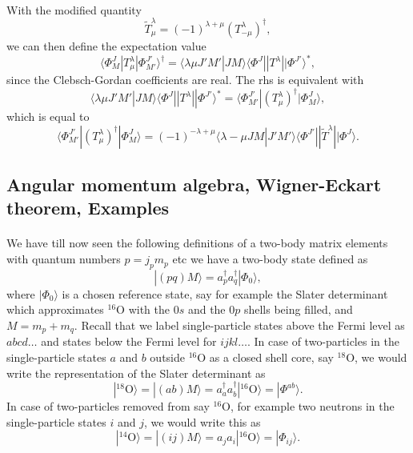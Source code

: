 \documentclass[%
twoside,                 %
final,                   %
10pt]{article}
\begin{document}
\paragraph{}
With the modified quantity 
\[
\tilde{T}^{\lambda}_{\mu}=(-1)^{\lambda+\mu}(T^{\lambda}_{-\mu})^{\dagger},
\]
we can then define the expectation value
\[
\langle \Phi^J_M|T^{\lambda}_{\mu}|\Phi^{J'}_{M'}\rangle^{\dagger} = \langle \lambda \mu J'M'|JM\rangle\langle \Phi^J||T^{\lambda}||\Phi^{J'}\rangle^*,
\]
since the Clebsch-Gordan coefficients are real. The rhs is equivalent with 
\[
\langle \lambda \mu J'M'|JM\rangle\langle \Phi^J||T^{\lambda}||\Phi^{J'}\rangle^*=\langle \Phi^{J'}_{M'}|(T^{\lambda}_{\mu})^{\dagger}|\Phi^{J}_{M}\rangle,
\]
which is equal to 
\[
\langle \Phi^{J'}_{M'}|(T^{\lambda}_{\mu})^{\dagger}|\Phi^{J}_{M}\rangle=(-1)^{-\lambda+\mu}\langle \lambda -\mu JM|J'M'\rangle\langle \Phi^{J'}||\tilde{T}^{\lambda}||\Phi^{J}\rangle.
\]



\subsection*{Angular momentum algebra, Wigner-Eckart theorem, Examples}

\paragraph{}
We have till now seen the following definitions of a two-body matrix elements 
with quantum numbers $p=j_pm_p$ etc we have a two-body state defined as
\[
|(pq)M\rangle  = a^{\dagger}_pa^{\dagger}_q|\Phi_0\rangle,
\]
where $|\Phi_0\rangle$ is a chosen reference state, say for example the Slater determinant which approximates 
${}^{16}\mbox{O}$ with the $0s$ and the $0p$ shells being filled, and $M=m_p+m_q$. Recall that we label single-particle states above the Fermi level as $abcd\dots$ and states below the Fermi level for $ijkl\dots$.  
In case of two-particles in the single-particle states $a$ and $b$ outside ${}^{16}\mbox{O}$ as a closed shell core, say ${}^{18}\mbox{O}$, 
we would write the representation of the Slater determinant as
\[
|^{18}\mathrm{O}\rangle =|(ab)M\rangle  = a^{\dagger}_aa^{\dagger}_b|^{16}\mathrm{O}\rangle=|\Phi^{ab}\rangle.
\]
In case of two-particles removed from say ${}^{16}\mbox{O}$, for example two neutrons in the single-particle states $i$ and $j$, we would write this as
\[
|^{14}\mathrm{O}\rangle =|(ij)M\rangle  = a_ja_i|^{16}\mathrm{O}\rangle=|\Phi_{ij}\rangle.
\]
\end{document}

